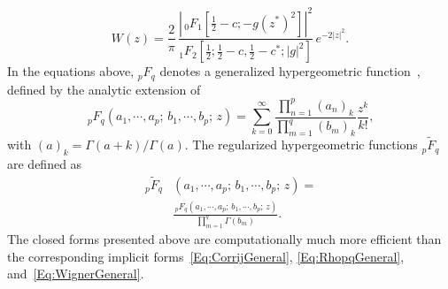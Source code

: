 \begin{equation}
\label{Eq:WignerNoF}
W(z)=\frac{2}{\pi}\,
\frac{\left|
	\,_0{F}_1\left[\frac{1}{2}-c;-g(z^*)^2\right]
	\right|^2}
{{}_1{F}_2\left[\frac{1}{2};\frac{1}{2}-c,\frac{1}{2}-c^*;|g|^2\right]}
\, e^{-2|z|^2}.
\end{equation}
In the equations above, $_p F_q$ denotes a generalized hypergeometric function~\cite{BaileyBOOK}, defined by the analytic extension of
\begin{equation}
\,_p F_q(a_1,\cdots,a_p;\,b_1,\cdots,b_p;\, z)=
\sum_{k=0}^{\infty}\frac
{\prod_{n=1}^{p} \left(a_n\right)_k}
{\prod_{m=1}^{q} \left(b_m\right)_k}
\frac{z^k}{k!},
\end{equation}
with \mbox{$\left(a\right)_k=\Gamma(a+k)/\Gamma(a)$}.
The regularized hypergeometric functions $_p \widetilde{F}_q$ are defined as
\begin{align}
\,_p \widetilde{F}_q&(a_1,\cdots,a_p;\,b_1,\cdots,b_p;\, z)=
\nonumber\\
&\frac{\,_p F_q(a_1,\cdots,a_p;\,b_1,\cdots,b_p;\, z)}
{\prod_{m=1}^{q} \Gamma(b_m)}.
\end{align}
The closed forms presented above are computationally much more efficient than the corresponding implicit forms~\eqref{Eq:CorrijGeneral}, \eqref{Eq:RhopqGeneral}, and~\eqref{Eq:WignerGeneral}.
